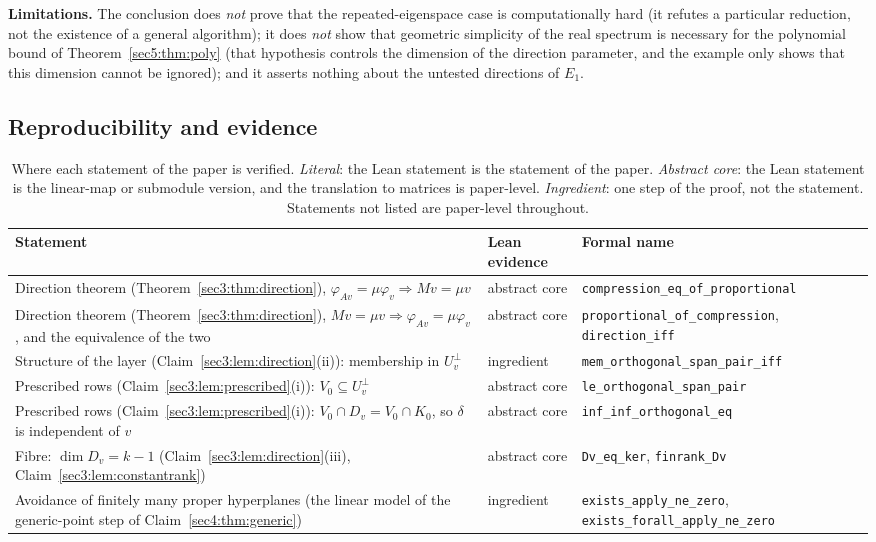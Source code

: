 \documentclass[journal]{IEEEtran}
\theoremstyle{plainn}
\theoremstyle{remark}
\begin{document}
\textbf{Limitations.} The conclusion does \emph{not} prove that the repeated-eigenspace case is
computationally hard (it refutes a particular reduction, not the existence of a general algorithm); it
does \emph{not} show that geometric simplicity of the real spectrum is necessary for the polynomial bound
of Theorem~\ref{sec5:thm:poly} (that hypothesis controls the dimension of the direction parameter, and the
example only shows that this dimension cannot be ignored); and it asserts nothing about the untested
directions of $E_1$.


\subsection{Reproducibility and evidence}

\begin{table}[!t]
\centering
\caption{Where each statement of the paper is verified. \emph{Literal}: the Lean statement is the
statement of the paper. \emph{Abstract core}: the Lean statement is the linear-map or submodule
version, and the translation to matrices is paper-level. \emph{Ingredient}: one step of the proof,
not the statement. Statements not listed are paper-level throughout.}
\label{tab:evidence}
\footnotesize
\begin{tabular}{@{}p{}>{\raggedright\arraybackslash}p{}>{\raggedright\arraybackslash}p{}@{}}
\toprule
Statement & Lean evidence & Formal name \\
\midrule
Direction theorem (Theorem~\ref{sec3:thm:direction}), $\varphi_{Av}=\mu\varphi_v\Rightarrow Mv=\mu v$
& abstract core & \texttt{compression\_eq\_of\_proportional} \\
Direction theorem (Theorem~\ref{sec3:thm:direction}), $Mv=\mu v\Rightarrow\varphi_{Av}=\mu\varphi_v$,
and the equivalence of the two & abstract core & \texttt{proportional\_of\_compression},
\texttt{direction\_iff} \\
Structure of the layer (Claim~\ref{sec3:lem:direction}(ii)): membership in $U_v^\perp$ &
ingredient & \texttt{mem\_orthogonal\_span\_pair\_iff} \\
Prescribed rows (Claim~\ref{sec3:lem:prescribed}(i)): $V_0\subseteq U_v^\perp$ &
abstract core & \texttt{le\_orthogonal\_span\_pair} \\
Prescribed rows (Claim~\ref{sec3:lem:prescribed}(i)): $V_0\cap D_v=V_0\cap K_0$, so $\delta$ is
independent of $v$ & abstract core & \texttt{inf\_inf\_orthogonal\_eq} \\
Fibre: $\dim D_v=k-1$ (Claim~\ref{sec3:lem:direction}(iii),
Claim~\ref{sec3:lem:constantrank}) & abstract core & \texttt{Dv\_eq\_ker},
\texttt{finrank\_Dv} \\
Avoidance of finitely many proper hyperplanes (the linear model of the generic-point step of
Claim~\ref{sec4:thm:generic}) & ingredient & \texttt{exists\_apply\_ne\_zero},
\texttt{exists\_forall\_apply\_ne\_zero} \\
\bottomrule
\end{tabular}
\end{table}
\end{document}
